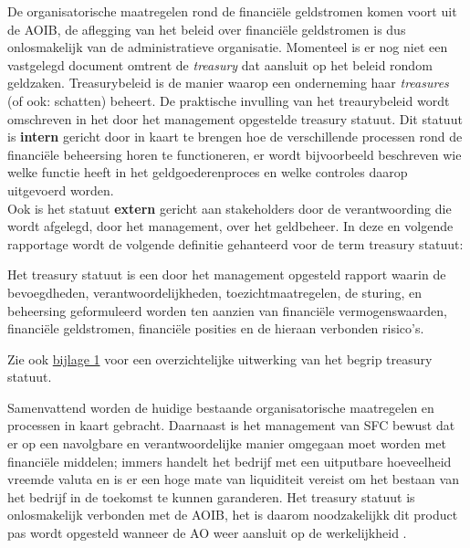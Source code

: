 \documentclass[10pt,a4paper,oneside]{report}
\begin{document}
De organisatorische maatregelen rond de financiële geldstromen komen voort uit de AOIB, de aflegging van het beleid over financiële geldstromen is dus onlosmakelijk van de administratieve organisatie. Momenteel is er nog niet een vastgelegd document omtrent de \textit{treasury} dat aansluit op het beleid rondom geldzaken. Treasurybeleid is de manier waarop een onderneming haar \textit{treasures} (of ook: schatten) beheert. De praktische invulling van het treaurybeleid wordt omschreven in het door het management opgestelde treasury statuut. 
Dit statuut is \textbf{intern} gericht door in kaart te brengen hoe de verschillende processen rond de financiële beheersing horen te functioneren, er wordt bijvoorbeeld beschreven wie welke functie heeft in het geldgoederenproces en welke controles daarop uitgevoerd worden. \\
Ook is het statuut \textbf{extern} gericht aan stakeholders door de verantwoording die wordt afgelegd, door het management, over het geldbeheer. \citep{ede,handreiking}
\newpage \noindent
In deze en volgende rapportage wordt de volgende definitie gehanteerd voor de term treasury statuut: 

\begin{displayquote}
Het treasury statuut is een door het management opgesteld rapport waarin de bevoegdheden, verantwoordelijkheden, toezichtmaatregelen, de sturing, en beheersing geformuleerd worden ten aanzien van financiële vermogenswaarden, financiële geldstromen, financiële posities en de hieraan verbonden risico’s. \\
\citep{handreiking} \label{def:treasury}
\end{displayquote}
\noindent
Zie ook \hyperlink{bij:treasury}{bijlage 1} voor een overzichtelijke uitwerking van het begrip treasury statuut.

Samenvattend worden de huidige bestaande organisatorische maatregelen en processen in kaart gebracht. Daarnaast is het management van SFC bewust dat er op een navolgbare en verantwoordelijke manier omgegaan moet worden met financiële middelen; immers handelt het bedrijf met een uitputbare hoeveelheid vreemde valuta en is er een hoge mate van liquiditeit vereist om het bestaan van het bedrijf in de toekomst te kunnen garanderen. Het treasury statuut is onlosmakelijk verbonden met de AOIB, het is daarom noodzakelijkk dit product pas wordt opgesteld wanneer de AO weer aansluit op de werkelijkheid \citep{watisonderzoek,buunk,financiering}.
\end{document}
